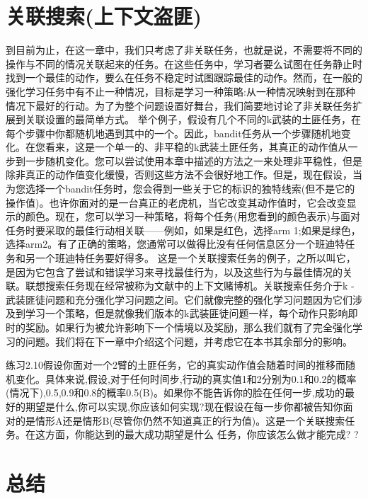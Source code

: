 \section{关联搜索(上下文盗匪)}
到目前为止，在这一章中，我们只考虑了非关联任务，也就是说，不需要将不同的操作与不同的情况关联起来的任务。在这些任务中，学习者要么试图在任务静止时找到一个最佳的动作，要么在任务不稳定时试图跟踪最佳的动作。然而，在一般的强化学习任务中有不止一种情况，目标是学习一种策略:从一种情况映射到在那种情况下最好的行动。为了为整个问题设置好舞台，我们简要地讨论了非关联任务扩展到关联设置的最简单方式。
举个例子，假设有几个不同的k武装的土匪任务，在每个步骤中你都随机地遇到其中的一个。因此，bandit任务从一个步骤随机地变化。在您看来，这是一个单一的、非平稳的k武装土匪任务，其真正的动作值从一步到一步随机变化。您可以尝试使用本章中描述的方法之一来处理非平稳性，但是除非真正的动作值变化缓慢，否则这些方法不会很好地工作。但是，现在假设，当为您选择一个bandit任务时，您会得到一些关于它的标识的独特线索(但不是它的操作值)。也许你面对的是一台真正的老虎机，当它改变其动作值时，它会改变显示的颜色。现在，您可以学习一种策略，将每个任务(用您看到的颜色表示)与面对任务时要采取的最佳行动相关联——例如，如果是红色，选择arm 1;如果是绿色，选择arm2。有了正确的策略，您通常可以做得比没有任何信息区分一个班迪特任务和另一个班迪特任务要好得多。
这是一个关联搜索任务的例子，之所以叫它，是因为它包含了尝试和错误学习来寻找最佳行为，以及这些行为与最佳情况的关联。联想搜索任务现在经常被称为文献中的上下文赌博机。关联搜索任务介于k -武装匪徒问题和充分强化学习问题之间。它们就像完整的强化学习问题因为它们涉及到学习一个策略，但是就像我们版本的k武装匪徒问题一样，每个动作只影响即时的奖励。如果行为被允许影响下一个情境以及奖励，那么我们就有了完全强化学习的问题。我们将在下一章中介绍这个问题，并考虑它在本书其余部分的影响。


练习2.10假设你面对一个2臂的土匪任务，它的真实动作值会随着时间的推移而随机变化。具体来说,假设,对于任何时间步,行动的真实值1和2分别为0.1和0.2的概率(情况下),0.5,0.9和0.8的概率0.5(B)。如果你不能告诉你的脸在任何一步,成功的最好的期望是什么,你可以实现,你应该如何实现?现在假设在每一步你都被告知你面对的是情形A还是情形B(尽管你仍然不知道真正的行为值)。这是一个关联搜索任务。在这方面，你能达到的最大成功期望是什么
任务，你应该怎么做才能完成? 					?

\section{总结}

